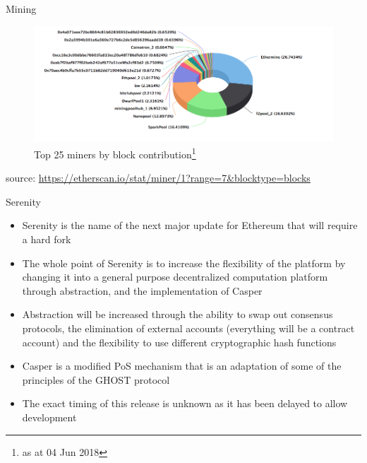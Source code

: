 \documentclass[10pt]{beamer}
\begin{document}

\begin{frame}{Mining}
	\begin{figure}[]
		\centering
		\includegraphics  [scale=0.25]{Images/eth-miners}
		\caption{Top 25 miners by block contribution\footnote{as at 04 Jun 2018}}
	\end{figure}
	\begin{scriptsize}
		source: \href{https://etherscan.io/stat/miner/1?range=7\&blocktype=blocks}{https://etherscan.io/stat/miner/1?range=7\&blocktype=blocks}
	\end{scriptsize}
\end{frame}


\begin{frame}{Serenity}
	\begin{itemize}
		\item Serenity is the name of the next major update for Ethereum that will require a hard fork
		\item The whole point of Serenity is to increase the flexibility of the platform by changing it into a general purpose decentralized computation platform through abstraction, and the implementation of Casper
		\item Abstraction will be increased through the ability to swap out consensus protocols, the elimination of external accounts (everything will be a contract account) and the flexibility to use different cryptographic hash functions
		\item Casper is a modified PoS mechanism that is an adaptation of some of the principles of the GHOST protocol
		\item The exact timing of this release is unknown as it has been delayed to allow development
	\end{itemize}
\end{frame}
\end{document}

